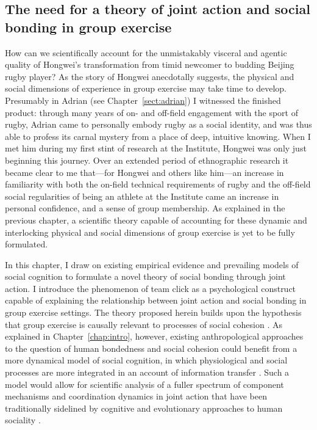 \begin{CJK}{UTF8}{gbsn}
\section{The need for a theory of joint action and social bonding in group exercise}

How can we scientifically account for the unmistakably visceral and agentic quality of Hongwei's transformation from timid newcomer to budding Beijing rugby player?  As the story of Hongwei anecdotally suggests, the physical and social dimensions of experience in group exercise may take time to develop.  Presumably in Adrian (see Chapter~\ref{sect:adrian}) I witnessed the finished product: through many years of on- and off-field engagement with the sport of rugby, Adrian came to personally embody rugby as a social identity, and was thus able to profess its carnal mystery from a place of deep, intuitive knowing.  When I met him during my first stint of research at the Institute, Hongwei was only just beginning this journey.  Over an extended period of ethnographic research it became clear to me that---for Hongwei and others like him---an increase in familiarity with both the on-field technical requirements of rugby and the off-field social regularities of being an athlete at the Institute came an increase in personal confidence, and a sense of group membership.  As explained in the previous chapter, a scientific theory capable of accounting for these dynamic and interlocking physical and social dimensions of group exercise is yet to be fully formulated.

In this chapter, I draw on existing empirical evidence and prevailing models of social cognition to formulate a novel theory of social bonding through joint action.  I introduce the phenomenon of team click as a psychological construct capable of explaining the relationship between joint action and social bonding in group exercise settings.  The theory proposed herein builds upon the hypothesis that group exercise is causally relevant to processes of social cohesion \citep{Dunbar2010,Whitehouse2014,Cohen2017}. As explained in Chapter~\ref{chap:intro}, however, existing anthropological approaches to the question of human bondedness and social cohesion could benefit from a more dynamical model of social cognition, in which physiological and social processes are more integrated in an account of information transfer  \citep{Roepstorff2010,Badcock2012,Ramstead2017}.  Such a model would allow for scientific analysis of a fuller spectrum of component mechanisms and coordination dynamics in joint action that have been traditionally sidelined by cognitive and evolutionary approaches to human sociality \citep{Claidiere2007}.


\end{CJK}
